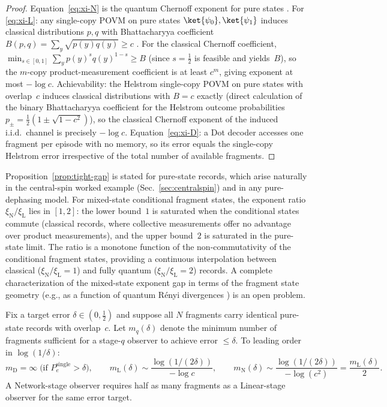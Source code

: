 \begin{proof}
Equation~\eqref{eq:xi-N} is the quantum Chernoff exponent for pure
states \citep{Audenaert2007,NussbaumSzkola2009}.
For \eqref{eq:xi-L}: any single-copy POVM on pure states
$\ket{\psi_0},\ket{\psi_1}$ induces classical distributions $p,q$ with
Bhattacharyya coefficient
$B(p,q)=\sum_y\sqrt{p(y)q(y)}\ge c$
\citep{FuchsCaves1994,Jozsa1994}.
For the classical Chernoff coefficient,
$\min_{s\in[0,1]}\sum_y p(y)^s q(y)^{1-s} \ge B$ (since $s=\tfrac12$
is feasible and yields~$B$), so the $m$-copy product-measurement
coefficient is at least $c^m$, giving exponent at most $-\log c$.
Achievability: the Helstrom single-copy POVM on pure states with
overlap~$c$ induces classical distributions with $B = c$ exactly
(direct calculation of the binary Bhattacharyya coefficient for the
Helstrom outcome probabilities
$p_\pm = \tfrac{1}{2}(1\pm\sqrt{1-c^2})$), so the classical Chernoff
exponent of the induced i.i.d.\ channel is precisely $-\log c$.
Equation~\eqref{eq:xi-D}: a Dot decoder accesses one fragment per
episode with no memory, so its error equals the single-copy Helstrom
error irrespective of the total number of available fragments.
\end{proof}


\begin{remark}
\label{rem:mixed-state-gap}
Proposition~\ref{prop:tight-gap} is stated for pure-state records,
which arise naturally in the central-spin worked example
(Sec.~\ref{sec:centralspin}) and in any pure-dephasing model.
For mixed-state conditional fragment states, the exponent ratio
$\xi_{\mathrm{N}}/\xi_{\mathrm{L}}$ lies in $[1,2]$:
the lower bound~$1$ is saturated when the conditional states commute
(classical records, where collective measurements offer no advantage
over product measurements),
and the upper bound~$2$ is saturated in the pure-state limit.
The ratio is a monotone function of the non-commutativity of the
conditional fragment states, providing a continuous interpolation between
classical ($\xi_{\mathrm{N}}/\xi_{\mathrm{L}}=1$) and fully quantum
($\xi_{\mathrm{N}}/\xi_{\mathrm{L}}=2$) records.
A complete characterization of the mixed-state exponent gap in terms of
the fragment state geometry (e.g., as a function of quantum
R\'{e}nyi divergences \citep{MosonyiOgawa2015}) is an open problem.
\end{remark}


\begin{corollary}
\label{cor:redundancy-stages}
Fix a target error $\delta\in(0,\tfrac12)$ and suppose all $N$ fragments
carry identical pure-state records with overlap~$c$.
Let $m_q(\delta)$ denote the minimum number of fragments sufficient for
a stage-$q$ observer to achieve error $\le\delta$.
To leading order in $\log(1/\delta)$:
\[
  m_{\mathrm{D}}=\infty\;\text{(if $P_e^{\mathrm{single}}>\delta$)},
  \qquad
  m_{\mathrm{L}}(\delta) \sim \frac{\log(1/(2\delta))}{-\log c},
  \qquad
  m_{\mathrm{N}}(\delta) \sim \frac{\log(1/(2\delta))}{-\log(c^2)}
  = \frac{m_{\mathrm{L}}(\delta)}{2}.
\]
A Network-stage observer requires half as many fragments as a
Linear-stage observer for the same error target.
\end{corollary}

